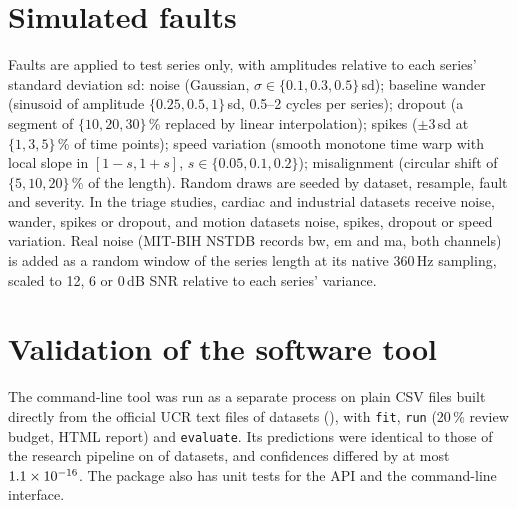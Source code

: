 \documentclass[11pt]{article}
\begin{document}
\begin{table}[h]
\caption{Datasets with exact or near train/test duplicates in the official splits.}\label{tab:leakage}
\centering\scriptsize
\end{table}

\section{Simulated faults}\label{sec:faults}
Faults are applied to test series only, with amplitudes relative to each series' standard deviation sd: noise (Gaussian, $\sigma\in\{0.1,0.3,0.5\}$\,sd); baseline wander (sinusoid of amplitude $\{0.25,0.5,1\}$\,sd, 0.5--2 cycles per series); dropout (a segment of $\{10,20,30\}$\,\% replaced by linear interpolation); spikes ($\pm3$\,sd at $\{1,3,5\}$\,\% of time points); speed variation (smooth monotone time warp with local slope in $[1-s,1+s]$, $s\in\{0.05,0.1,0.2\}$); misalignment (circular shift of $\{5,10,20\}$\,\% of the length). Random draws are seeded by dataset, resample, fault and severity. In the triage studies, cardiac and industrial datasets receive noise, wander, spikes or dropout, and motion datasets noise, spikes, dropout or speed variation. Real noise (MIT-BIH NSTDB records bw, em and ma, both channels) is added as a random window of the series length at its native 360\,Hz sampling, scaled to 12, 6 or 0\,dB SNR relative to each series' variance.

\section{Validation of the software tool}\label{sec:tool}
The command-line tool was run as a separate process on plain CSV files built directly from the official UCR text files of \ToolN{} datasets (\ToolDatasets), with \texttt{fit}, \texttt{run} (20\,\% review budget, HTML report) and \texttt{evaluate}. Its predictions were identical to those of the research pipeline on \ToolIdentical{} of \ToolN{} datasets, and confidences differed by at most $1.1\times10^{-16}$. The package also has unit tests for the API and the command-line interface.
\end{document}
